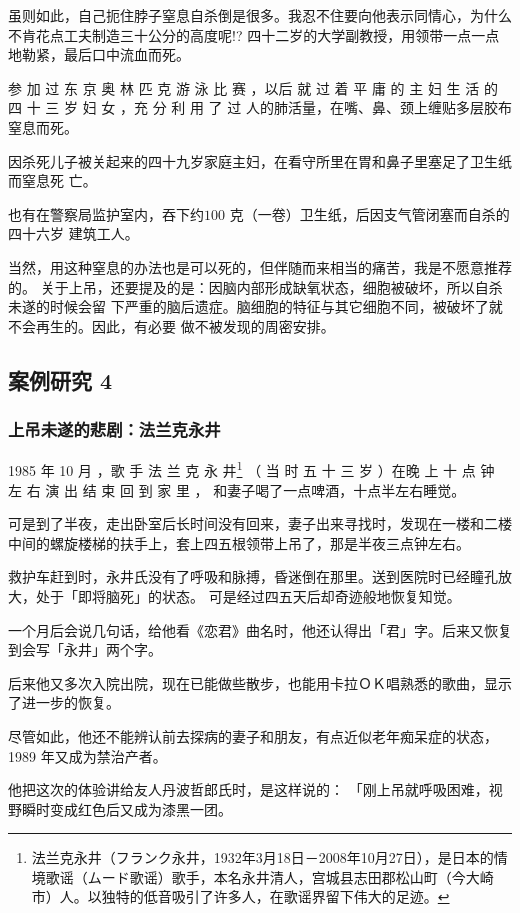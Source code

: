 \documentclass[UTF8]{ctexart}
\begin{document}
虽则如此，自己扼住脖子窒息自杀倒是很多。我忍不住要向他表示同情心，为什么不肯花点工夫制造三十公分的高度呢!?
四十二岁的大学副教授，用领带一点一点地勒紧，最后口中流血而死。

参 加 过 东 京 奥 林 匹 克 游 泳 比 赛 ，以后 就 过 着 平 庸 的 主 妇 生 活 的 四 十 三 岁 妇 女 ，充 分 利 用 了 过 人的肺活量，在嘴、鼻、颈上缠贴多层胶布窒息而死。

因杀死儿子被关起来的四十九岁家庭主妇，在看守所里在胃和鼻子里塞足了卫生纸而窒息死
亡。

也有在警察局监护室内，吞下约$100$ 克（一卷）卫生纸，后因支气管闭塞而自杀的四十六岁
建筑工人。

当然，用这种窒息的办法也是可以死的，但伴随而来相当的痛苦，我是不愿意推荐的。
关于上吊，还要提及的是：因脑内部形成缺氧状态，细胞被破坏，所以自杀未遂的时候会留
下严重的脑后遗症。脑细胞的特征与其它细胞不同，被破坏了就不会再生的。因此，有必要
做不被发现的周密安排。

\subsection{案例研究 4}
\subsubsection*{上吊未遂的悲剧：法兰克永井}

1985 年 10 月 ，歌 手 法 兰 克 永 井\footnote{法兰克永井（フランク永井，1932年3月18日－2008年10月27日），是日本的情境歌谣（ムード歌谣）歌手，本名永井清人，宫城县志田郡松山町（今大崎市）人。以独特的低音吸引了许多人，在歌谣界留下伟大的足迹。} （ 当 时 五 十 三 岁 ）在晚 上 十 点 钟 左 右 演 出 结 束 回 到 家 里 ， 和妻子喝了一点啤酒，十点半左右睡觉。

可是到了半夜，走出卧室后长时间没有回来，妻子出来寻找时，发现在一楼和二楼中间的螺旋楼梯的扶手上，套上四五根领带上吊了，那是半夜三点钟左右。

救护车赶到时，永井氏没有了呼吸和脉搏，昏迷倒在那里。送到医院时已经瞳孔放大，处于「即将脑死」的状态。
可是经过四五天后却奇迹般地恢复知觉。

一个月后会说几句话，给他看《恋君》曲名时，他还认得出「君」字。后来又恢复到会写「永井」两个字。

后来他又多次入院出院，现在已能做些散步，也能用卡拉ＯＫ唱熟悉的歌曲，显示了进一步的恢复。

尽管如此，他还不能辨认前去探病的妻子和朋友，有点近似老年痴呆症的状态，1989 年又成为禁治产者。

他把这次的体验讲给友人丹波哲郎氏时，是这样说的： 「刚上吊就呼吸困难，视野瞬时变成红色后又成为漆黑一团。
\end{document}
